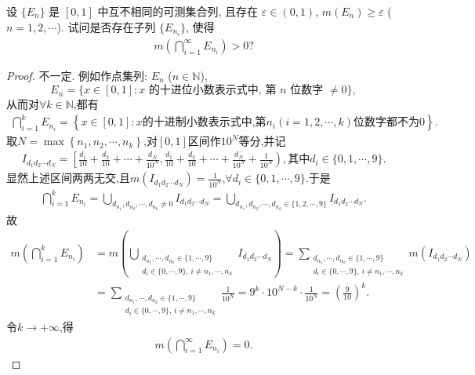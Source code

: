 \documentclass[../../main.tex]{subfiles}%
\begin{document}
\begin{example}
设 $\{E_n\}$ 是 $[0,1]$ 中互不相同的可测集合列, 且存在 $\varepsilon\in (0,1)$, $m(E_n)\geqslant\varepsilon$ ($n=1,2,\cdots$). 试问是否存在子列 $\{E_{n_i}\}$, 使得
\begin{align*}
m\left(\bigcap\limits_{i=1}^{\infty}E_{n_i}\right)>0?
\end{align*}
\end{example}
\begin{proof}
不一定. 例如作点集列: $E_n$ ($n\in\mathbb{N}$),
\[
E_n=\{x\in[0,1]: x\text{ 的十进位小数表示式中, 第 }n\text{ 位数字 }\neq 0\},
\]
从而对$\forall k\in \mathbb{N}$,都有
\begin{align*}
\bigcap\limits_{i=1}^k{E_{n_i}}=\left\{ x\in [0,1]:x\text{的十进制小数表示式中,第}n_i\left( i=1,2,\cdots ,k \right) \text{位数字都不为}0 \right\}.
\end{align*}
取$N=\max\left\{ n_1,n_2,\cdots ,n_k \right\}$,对$[0,1]$区间作$10^N$等分,并记
\begin{align*}
I_{d_1d_2\cdots d_N}=\left[ \frac{d_1}{10}+\frac{d_2}{10}+\cdots +\frac{d_N}{10^N},\frac{d_1}{10}+\frac{d_2}{10}+\cdots +\frac{d_N}{10^N}+\frac{1}{10^N} \right),\text{其中}d_i\in \{0,1,\cdots ,9\}.
\end{align*}
显然上述区间两两无交,且$m\left( I_{d_1d_2\cdots d_N} \right) =\frac{1}{10^N}$,$\forall d_i\in \{0,1,\cdots ,9\}$.于是
\begin{align*}
\bigcap\limits_{i=1}^k{E_{n_i}}=\bigcup\limits_{d_{n_1},d_{n_2},\cdots ,d_{n_k}\ne 0}{I_{d_1d_2\cdots d_N}}=\bigcup\limits_{d_{n_1},d_{n_2},\cdots ,d_{n_k}\in \{1,2,\cdots ,9\}}{I_{d_1d_2\cdots d_N}}.
\end{align*}
故
\begin{align*}
m\left( \bigcap_{i=1}^k{E_{n_i}} \right) 
&= m\left( \bigcup_{\substack{d_{n_1},\cdots,d_{n_k}\in\{1,\cdots,9\} \\ d_i\in\{0,\cdots,9\},\,i\neq n_1,\cdots,n_k}} I_{d_1d_2\cdots d_N} \right) 
= \sum_{\substack{d_{n_1},\cdots,d_{n_k}\in\{1,\cdots,9\} \\ d_i\in\{0,\cdots,9\},\,i\neq n_1,\cdots,n_k}} m\left( I_{d_1d_2\cdots d_N} \right) \\
&= \sum_{\substack{d_{n_1},\cdots,d_{n_k}\in\{1,\cdots,9\} \\ d_i\in\{0,\cdots,9\},\,i\neq n_1,\cdots,n_k}} \frac{1}{10^N} 
= 9^k \cdot 10^{N-k} \cdot \frac{1}{10^N} = \left( \frac{9}{10} \right)^k.
\end{align*}
令$k\to +\infty$,得
\begin{align*}
m\left( \bigcap_{i=1}^{\infty}{E_{n_i}} \right)=0. 
\end{align*}
\end{proof}
\end{document}
